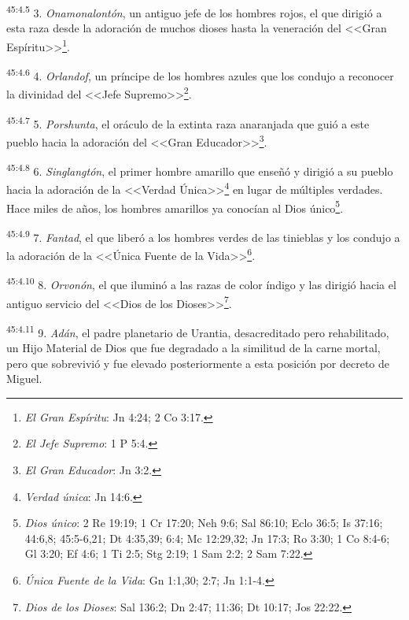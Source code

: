 \par
\textsuperscript{45:4.5} 3. \textit{Onamonalontón}, un antiguo jefe de los hombres rojos, el que dirigió a esta raza desde la adoración de muchos dioses hasta la veneración del <<Gran Espíritu>>\footnote{\textit{El Gran Espíritu}: Jn 4:24; 2 Co 3:17.}.

\par
\textsuperscript{45:4.6} 4. \textit{Orlandof}, un príncipe de los hombres azules que los condujo a reconocer la divinidad del <<Jefe Supremo>>\footnote{\textit{El Jefe Supremo}: 1 P 5:4.}.

\par
\textsuperscript{45:4.7} 5. \textit{Porshunta}, el oráculo de la extinta raza anaranjada que guió a este pueblo hacia la adoración del <<Gran Educador>>\footnote{\textit{El Gran Educador}: Jn 3:2.}.

\par
\textsuperscript{45:4.8} 6. \textit{Singlangtón}, el primer hombre amarillo que enseñó y dirigió a su pueblo hacia la adoración de la <<Verdad Única>>\footnote{\textit{Verdad única}: Jn 14:6.} en lugar de múltiples verdades. Hace miles de años, los hombres amarillos ya conocían al Dios único\footnote{\textit{Dios único}: 2 Re 19:19; 1 Cr 17:20; Neh 9:6; Sal 86:10; Eclo 36:5; Is 37:16; 44:6,8; 45:5-6,21; Dt 4:35,39; 6:4; Mc 12:29,32; Jn 17:3; Ro 3:30; 1 Co 8:4-6; Gl 3:20; Ef 4:6; 1 Ti 2:5; Stg 2:19; 1 Sam 2:2; 2 Sam 7:22.}.

\par
\textsuperscript{45:4.9} 7. \textit{Fantad}, el que liberó a los hombres verdes de las tinieblas y los condujo a la adoración de la <<Única Fuente de la Vida>>\footnote{\textit{Única Fuente de la Vida}: Gn 1:1,30; 2:7; Jn 1:1-4.}.

\par
\textsuperscript{45:4.10} 8. \textit{Orvonón}, el que iluminó a las razas de color índigo y las dirigió hacia el antiguo servicio del <<Dios de los Dioses>>\footnote{\textit{Dios de los Dioses}: Sal 136:2; Dn 2:47; 11:36; Dt 10:17; Jos 22:22.}.

\par
\textsuperscript{45:4.11} 9. \textit{Adán}, el padre planetario de Urantia, desacreditado pero rehabilitado, un Hijo Material de Dios que fue degradado a la similitud de la carne mortal, pero que sobrevivió y fue elevado posteriormente a esta posición por decreto de Miguel.

